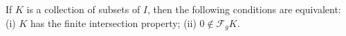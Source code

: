 If $K$ is a collection of subsets of $I$, then the following conditions are equivalent:
(i) $K$ has the finite intersection property;
(ii) $0 \notin \mathcal{F}_gK$.
